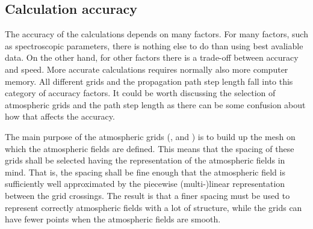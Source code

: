 


\subsection{Calculation accuracy}
\label{sec:fm_defs:accuracy}

The accuracy of the calculations depends on many factors. For many
factors, such as spectroscopic parameters, there is nothing else to do
than using best avaliable data. On the other hand, for other factors
there is a trade-off between accuracy and speed. More accurate
calculations requires normally also more computer memory. All
different grids and the propagation path step length fall into this
category of accuracy factors. It could be worth discussing the
selection of atmospheric grids and the path step length as there can
be some confusion about how that affects the accuracy.

The main purpose of the atmospheric grids (,
 and ) is to build up the
mesh on which the atmospheric fields are defined. This means that the
spacing of these grids shall be selected having the representation of
the atmospheric fields in mind. That is, the spacing shall be fine
enough that the atmospheric field is sufficiently well approximated by
the piecewise (multi-)linear representation between the grid
crossings. The result is that a finer spacing must be used to
represent correctly atmospheric fields with a lot of structure, while
the grids can have fewer points when the atmospheric fields are
smooth. 

